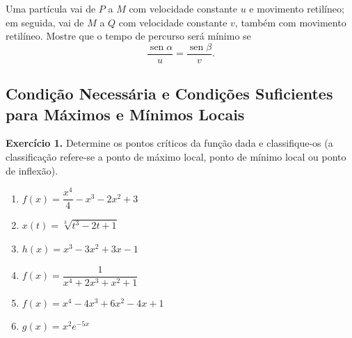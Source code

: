 \documentclass[12pt,a4paper]{article}
\begin{document}
\begin{center}
\end{center}

\noindent Uma partícula vai de $P$ a $M$ com velocidade constante $u$ e movimento retilíneo; em seguida, vai de $M$ a $Q$ com velocidade constante $v$, também com movimento retilíneo. Mostre que o tempo de percurso será mínimo se
\[
\dfrac{\operatorname{sen}\alpha}{u} = \dfrac{\operatorname{sen}\beta}{v}.
\]

\subsection{Condição Necessária e Condições Suficientes para Máximos e Mínimos Locais}
\vspace{0.5cm}
\noindent\textbf{Exercício 1.} Determine os pontos críticos da função dada e classifique-os (a classificação refere-se a ponto de máximo local, ponto de mínimo local ou ponto de inflexão).
\begin{enumerate}
    \renewcommand{\theenumi}{\alph{enumi}}
    \renewcommand{\labelenumi}{\theenumi)}
    \item $f(x) = \dfrac{x^4}{4} - x^3 - 2x^2 + 3$
    \item $x(t) = \sqrt[3]{t^3 - 2t + 1}$
    \item $h(x) = x^3 - 3x^2 + 3x - 1$
    \item $f(x) = \dfrac{1}{x^4 + 2x^3 + x^2 + 1}$
    \item $f(x) = x^4 - 4x^3 + 6x^2 - 4x + 1$
    \item $g(x) = x^2 e^{-5x}$
\end{enumerate}
\end{document}
